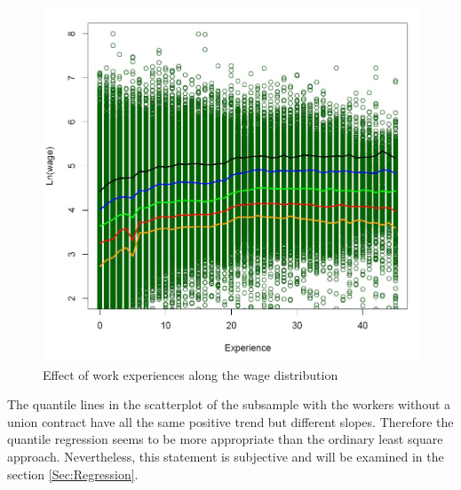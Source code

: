 \begin{figure}
\begin{center}
\caption{Effect of work experiences along the wage distribution}
\label{Fig:scatter}
\includegraphics[scale=0.4]{scatterplotNoFCSC-lnwage-experience}
\end{center}
\end{figure}
The quantile lines in the scatterplot of the subsample with the workers without a union contract have all the same positive trend but different slopes. Therefore the quantile regression seems to be more appropriate than the ordinary least square approach. Nevertheless, this statement is subjective and will be examined in the section \ref{Sec:Regression}.

